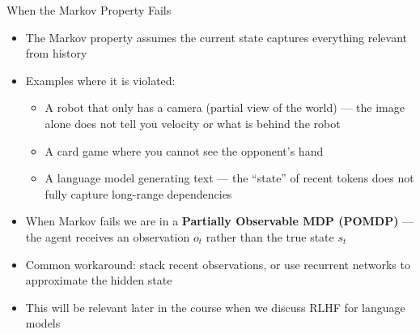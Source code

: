 \begin{frame}{When the Markov Property Fails}
\begin{itemize}
    \item The Markov property assumes the current state captures everything relevant from history
    \item Examples where it is violated:
    \begin{itemize}
        \item A robot that only has a camera (partial view of the world) --- the image alone does not tell you velocity or what is behind the robot
        \item A card game where you cannot see the opponent's hand
        \item A language model generating text --- the ``state'' of recent tokens does not fully capture long-range dependencies
    \end{itemize}
    \item When Markov fails we are in a \textbf{Partially Observable MDP (POMDP)} --- the agent receives an observation $o_t$ rather than the true state $s_t$
    \item Common workaround: stack recent observations, or use recurrent networks to approximate the hidden state
    \item This will be relevant later in the course when we discuss RLHF for language models
\end{itemize}
\end{frame}